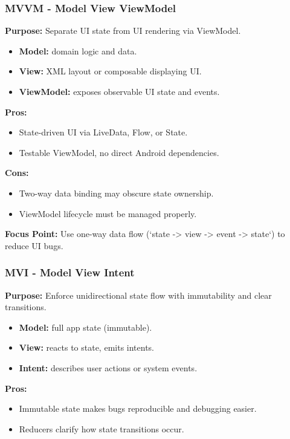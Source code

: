 \documentclass[a4paper,12pt]{article}
\begin{document}
\subsubsection{MVVM - Model View ViewModel}

\textbf{Purpose:} Separate UI state from UI rendering via ViewModel.

\begin{itemize}
  \item \textbf{Model:} domain logic and data.
  \item \textbf{View:} XML layout or composable displaying UI.
  \item \textbf{ViewModel:} exposes observable UI state and events.
\end{itemize}

\textbf{Pros:}
\begin{itemize}
  \item State-driven UI via LiveData, Flow, or State.
  \item Testable ViewModel, no direct Android dependencies.
\end{itemize}

\textbf{Cons:}
\begin{itemize}
  \item Two-way data binding may obscure state ownership.
  \item ViewModel lifecycle must be managed properly.
\end{itemize}

\textbf{Focus Point:} Use one-way data flow (`state -> view -> event -> state`) to reduce UI bugs.

\subsubsection{MVI - Model View Intent}

\textbf{Purpose:} Enforce unidirectional state flow with immutability and clear transitions.

\begin{itemize}
  \item \textbf{Model:} full app state (immutable).
  \item \textbf{View:} reacts to state, emits intents.
  \item \textbf{Intent:} describes user actions or system events.
\end{itemize}

\textbf{Pros:}
\begin{itemize}
  \item Immutable state makes bugs reproducible and debugging easier.
  \item Reducers clarify how state transitions occur.
\end{itemize}
\end{document}
